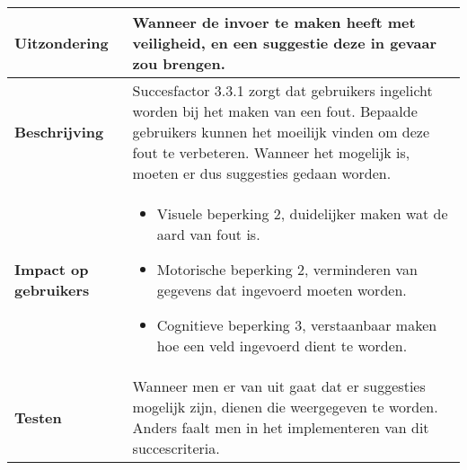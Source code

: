 \begin{table}[H]
\begin{tabular}{|l|p{12cm}|}
        \\  
         \hline
        \textbf{Uitzondering}     & 
        Wanneer de invoer te maken heeft met veiligheid, en een suggestie deze in gevaar zou brengen.                                                                                                                                                                                                 \\ 
        \hline
        \textbf{Beschrijving}                 & Succesfactor 3.3.1 zorgt dat gebruikers ingelicht worden bij het maken van een fout. Bepaalde gebruikers kunnen het moeilijk vinden om deze fout te verbeteren. Wanneer het mogelijk is, moeten er dus suggesties gedaan worden.  \\ 
        \hline
        \textbf{Impact op gebruikers}         &  
        \begin{itemize}
            \item Visuele beperking 2, duidelijker maken wat de aard van fout is.
            \item Motorische beperking 2, verminderen van gegevens dat ingevoerd moeten worden.
            \item Cognitieve beperking 3, verstaanbaar maken hoe een veld ingevoerd dient te worden.
        \end{itemize}                                                                                                                                                                                                                                                                                                     \\ 
        
        \hline
        \textbf{Testen}                       & Wanneer men er van uit gaat dat er suggesties mogelijk zijn, dienen die weergegeven te worden. Anders faalt men in het implementeren van dit succescriteria.                     \\
        \hline
    \end{tabular}
    
\end{table}
\newpage
